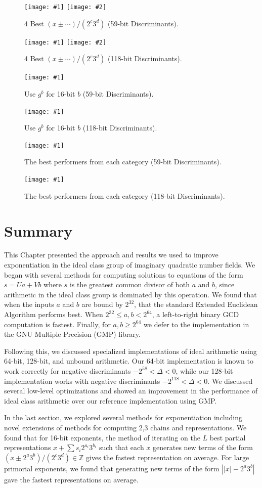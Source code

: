\documentclass{ucalgthes1}
\theoremstyle{definition}
\newcommand{\ZZ}{\mathbb{Z}}
\newcommand{\mygraph}[3]{
	\begin{figure}[H]
	\centering
	\texttt{[image: \#1]}
	\caption{#3}
	\label{#2}
	\end{figure}
}
\newcommand{\mygraphTwo}[4]{
	\begin{figure}[H]
	\centering
	\texttt{[image: \#1]}
	\texttt{[image: \#2]}
	\caption{#4}
	\label{#3}
	\end{figure}
}
\begin{document}
\mygraphTwo{pm_variants-64}{pm_variants-64-zoom}{fig:expPmVariants64}{4 Best $(x\pm\cdots)/(2^c3^d)$ (59-bit Discriminants).}
\mygraphTwo{pm_variants-128}{pm_variants-128-zoom}{fig:expPmVariants128}{4 Best $(x\pm\cdots)/(2^c3^d)$ (118-bit Discriminants).}

\mygraph{block_vs_list-64}{fig:expBlockList64}{Use $g^b$ for 16-bit $b$ (59-bit Discriminants).}
\mygraph{block_vs_list-128}{fig:expBlockList128}{Use $g^b$ for 16-bit $b$ (118-bit Discriminants).}

\mygraph{winners-64}{fig:expWinners64}{The best performers from each category (59-bit Discriminants).}
\mygraph{winners-128}{fig:expWinners128}{The best performers from each category (118-bit Discriminants).}

\bigbreak
\section{Summary}

This Chapter presented the approach and results we used to improve exponentiation in the ideal class group of imaginary quadratic number fields.  We began with several methods for computing solutions to equations of the form $s=Ua + Vb$ where $s$ is the greatest common divisor of both $a$ and $b$, since arithmetic in the ideal class group is dominated by this operation.  We found that when the inputs $a$ and $b$ are bound by $2^{32}$, that the standard Extended Euclidean Algorithm performs best.  When $2^{32} \le a,b < 2^{64}$, a left-to-right binary GCD computation is fastest.  Finally, for $a,b \ge 2^{64}$ we defer to the implementation in the GNU Multiple Precision (GMP) library.

Following this, we discussed specialized implementations of ideal arithmetic using 64-bit, 128-bit, and unbound arithmetic.  Our 64-bit implementation is known to work correctly for negative discriminants $-2^{58} < \Delta < 0$, while our 128-bit implementation works with negative discriminants $-2^{118} < \Delta < 0$. We discussed several low-level optimizations and showed an improvement in the performance of ideal class arithmetic over our reference implementation using GMP.

In the last section, we explored several methods for exponentiation including novel extensions of methods for computing 2,3 chains and representations.  We found that for 16-bit exponents, the method of iterating on the $L$ best partial representations $x + \sum s_i2^{a_i}3^{b_i}$ such that each $x$ generates new terms of the form $(x \pm 2^a 3^b)/(2^c3^d) \in \ZZ$ gives the fastest representation on average.  For large primorial exponents, we found that generating new terms of the form $\left||x|-2^a3^b\right|$ gave the fastest representations on average.
\end{document}
